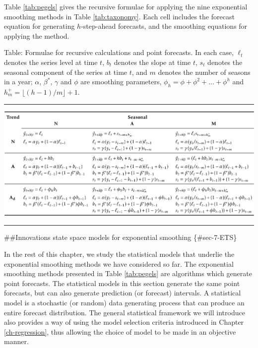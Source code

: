 \documentclass[]{book}
\begin{document}
Table \ref{tab:pegels} gives the recursive formulae for applying the nine exponential smoothing methods in Table \ref{tab:taxonomy}. Each cell includes the forecast equation for generating \(h\)-step-ahead forecasts, and the smoothing equations for applying the method.

Table: \label{tab:pegels} Formulae for recursive calculations and point forecasts. In each case, \(\ell_t\) denotes the series level at time \(t\), \(b_t\) denotes the slope at time \(t\), \(s_t\) denotes the seasonal component of the series at time \(t\), and \(m\) denotes the number of seasons in a year; \(\alpha\), \(\beta^*\), \(\gamma\) and \(\phi\) are smoothing parameters, \(\phi_h = \phi+\phi^2+\dots+\phi^{h}\) and \(h_m^+ = \lfloor(h-1) / m\rfloor + 1\).

\begin{center}\rule{0.5\linewidth}{\linethickness}\end{center}

\begin{center}\includegraphics[width=0.9\linewidth]{pegelstable} \end{center}

\begin{center}\rule{0.5\linewidth}{\linethickness}\end{center}

\#\#Innovations state space models for exponential smoothing \{\#sec-7-ETS\}

In the rest of this chapter, we study the statistical models that underlie the exponential smoothing methods we have considered so far. The exponential smoothing methods presented in Table \ref{tab:pegels} are algorithms which generate point forecasts. The statistical models in this section generate the same point forecasts, but can also generate prediction (or forecast) intervals. A statistical model is a stochastic (or random) data generating process that can produce an entire forecast distribution. The general statistical framework we will introduce also provides a way of using the model selection criteria introduced in Chapter \ref{ch-regression}, thus allowing the choice of model to be made in an objective manner.
\end{document}
